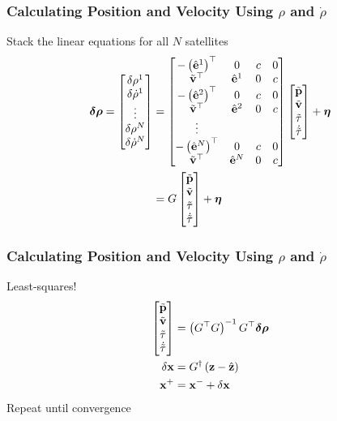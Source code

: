 \documentclass{beamer}
\begin{document}
\begin{frame}\frametitle{Calculating Position and Velocity Using $\rho$ and $\dot{\rho}$}
Stack the linear equations for all $N$ satellites
\begin{align*}
\boldsymbol{\delta\rho}=\begin{bmatrix}\delta\rho^{1}\\
\delta\dot{\rho}^{1}\\
\vdots\\
\delta\rho^{N}\\
\delta\dot{\rho}^{N}
\end{bmatrix} & =\begin{bmatrix}-\left(\hat{\mathbf{e}}^{1}\right)^{\top} & 0 & c & 0\\
\tilde{\mathbf{v}}^{\top} & \hat{\mathbf{e}}^{1} & 0 & c\\
-\left(\hat{\mathbf{e}}^{2}\right)^{\top} & 0 & c & 0\\
\tilde{\mathbf{v}}^{\top} & \hat{\mathbf{e}}^{2} & 0 & c\\
\vdots\\
-\left(\hat{\mathbf{e}}^{N}\right)^{\top} & 0 & c & 0\\
\tilde{\mathbf{v}}^{\top} & \hat{\mathbf{e}}^{N} & 0 & c
\end{bmatrix}\begin{bmatrix}\tilde{\mathbf{p}}\\
\tilde{\mathbf{v}}\\
\tilde{\tau}\\
\dot{\tilde{\tau}}
\end{bmatrix}+\boldsymbol{\eta}\\
 & =G\begin{bmatrix}\tilde{\mathbf{p}}\\
\tilde{\mathbf{v}}\\
\tilde{\tau}\\
\dot{\tilde{\tau}}
\end{bmatrix}+\boldsymbol{\eta}
\end{align*}
\end{frame}


\begin{frame}\frametitle{Calculating Position and Velocity Using $\rho$ and $\dot{\rho}$}
Least-squares! 
\begin{align}
	\begin{bmatrix}\tilde{\mathbf{p}}\\
\tilde{\mathbf{v}}\\
\tilde{\tau}\\
\dot{\tilde{\tau}}
\end{bmatrix}&=\left(G^{\top}G\right)^{-1}G^{\top}\boldsymbol{\delta\rho}\\
\delta \mathbf{x} &= G^\dagger \left(\mathbf{z} - \hat{\mathbf{z}}\right) \\
{\mathbf{x}}^{+} &= {\mathbf{x}}^{-} + \delta{\mathbf{x}}
\end{align}
Repeat until convergence
\end{frame}
\end{document}
